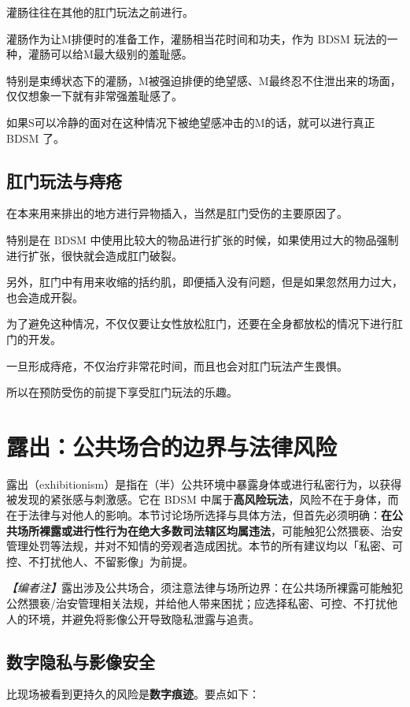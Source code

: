 \documentclass[12pt,UTF8]{ctexbook}
\begin{document}
灌肠往往在其他的肛门玩法之前进行。

灌肠作为让M排便时的准备工作，灌肠相当花时间和功夫，作为 BDSM 玩法的一种，灌肠可以给M最大级别的羞耻感。

特别是束缚状态下的灌肠，M被强迫排便的绝望感、M最终忍不住泄出来的场面，仅仅想象一下就有非常强羞耻感了。

如果S可以冷静的面对在这种情况下被绝望感冲击的M的话，就可以进行真正 BDSM 了。

\subsection{肛门玩法与痔疮}

在本来用来排出的地方进行异物插入，当然是肛门受伤的主要原因了。

特别是在 BDSM 中使用比较大的物品进行扩张的时候，如果使用过大的物品强制进行扩张，很快就会造成肛门破裂。

另外，肛门中有用来收缩的括约肌，即便插入没有问题，但是如果忽然用力过大，也会造成开裂。

为了避免这种情况，不仅仅要让女性放松肛门，还要在全身都放松的情况下进行肛门的开发。

一旦形成痔疮，不仅治疗非常花时间，而且也会对肛门玩法产生畏惧。

所以在预防受伤的前提下享受肛门玩法的乐趣。 

\section{露出：公共场合的边界与法律风险}

露出（exhibitionism）是指在（半）公共环境中暴露身体或进行私密行为，以获得被发现的紧张感与刺激感。它在 BDSM 中属于\textbf{高风险玩法}，风险不在于身体，而在于法律与对他人的影响。本节讨论场所选择与具体方法，但首先必须明确：\textbf{在公共场所裸露或进行性行为在绝大多数司法辖区均属违法}，可能触犯公然猥亵、治安管理处罚等法规，并对不知情的旁观者造成困扰。本节的所有建议均以「私密、可控、不打扰他人、不留影像」为前提。

\noindent\textit{【编者注】}露出涉及公共场合，须注意法律与场所边界：在公共场所裸露可能触犯公然猥亵/治安管理相关法规，并给他人带来困扰；应选择私密、可控、不打扰他人的环境，并避免将影像公开导致隐私泄露与追责。

\subsection{数字隐私与影像安全}

比现场被看到更持久的风险是\textbf{数字痕迹}。要点如下：
\end{document}
